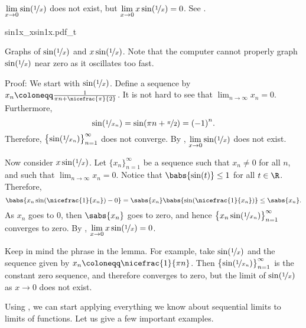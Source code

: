 \begin{example}
$\displaystyle \lim_{x \to 0} \sin( \nicefrac{1}{x} )$
does not exist, but 
$\displaystyle \lim_{x \to 0} x\sin( \nicefrac{1}{x} ) = 0$.
See .

\begin{myfigureht}
{sin1x_xsin1x.pdf_t}
\caption{Graphs of $\sin(\nicefrac{1}{x})$ and $x \sin(\nicefrac{1}{x})$.
Note that the computer cannot properly graph $\sin(\nicefrac{1}{x})$
near zero as it oscillates too fast.\label{figsin1x}}
\end{myfigureht}

Proof:
We start with $\sin(\nicefrac{1}{x})$.  Define a sequence
by
$x_n \coloneqq \frac{1}{\pi n + \nicefrac{\pi}{2}}$.  It is not hard to see
that $\lim_{n\to\infty} x_n = 0$.  Furthermore,
\begin{equation*}
\sin ( \nicefrac{1}{x_n} )
=
\sin (\pi n + \nicefrac{\pi}{2})
= {(-1)}^n .
\end{equation*}
Therefore, $\bigl\{ \sin ( \nicefrac{1}{x_n} ) \bigr\}_{n=1}^\infty$ does not converge.
By
, 
$\displaystyle \lim_{x \to 0} \sin( \nicefrac{1}{x} )$ does not exist.

Now consider $x\sin(\nicefrac{1}{x})$.  Let $\{ x_n \}_{n=1}^\infty$ be a sequence
such that $x_n \not= 0$ for all $n$, and such that $\lim_{n\to\infty} x_n = 0$.
Notice that $\babs{\sin(t)} \leq 1$ for all $t \in \R$.  Therefore,
\begin{equation*}
\babs{x_n\sin(\nicefrac{1}{x_n})-0}
=
\sabs{x_n}\babs{\sin(\nicefrac{1}{x_n})}
\leq
\sabs{x_n} .
\end{equation*}
As $x_n$ goes to 0, then $\sabs{x_n}$ goes to zero, and hence
$\bigl\{ x_n\sin(\nicefrac{1}{x_n}) \bigr\}_{n=1}^\infty$ converges to zero.  By
, 
$\displaystyle \lim_{x \to 0} x\sin( \nicefrac{1}{x} ) = 0$.
\end{example}

Keep in mind the phrase  in the lemma.
For example, take $\sin(\nicefrac{1}{x})$ and the sequence given by
$x_n \coloneqq \nicefrac{1}{\pi n}$.
Then $\bigl\{ \sin (\nicefrac{1}{x_n}) \bigr\}_{n=1}^\infty$
is the constant zero sequence, and
therefore converges to zero, but the limit of 
$\sin(\nicefrac{1}{x})$ as $x \to 0$ does not exist.

Using , 
we can start applying everything we know about
sequential limits to limits of functions.  Let us give a few important
examples.

